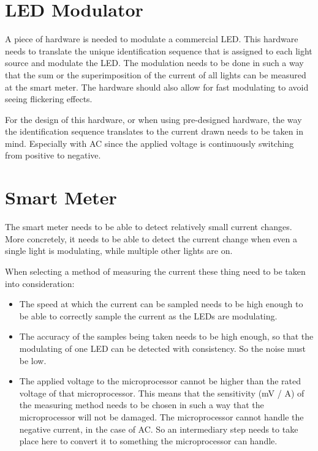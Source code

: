 	\section{LED Modulator}

	A piece of hardware is needed to modulate a commercial LED.
	This hardware needs to translate the unique identification sequence that is assigned to each light source and modulate the LED.
	The modulation needs to be done in such a way that the sum or the superimposition of the current of all lights can be measured at the smart meter.  
	The hardware should also allow for fast modulating to avoid seeing flickering effects.


	For the design of this hardware, or when using pre-designed hardware, the way the identification sequence translates to the current drawn needs to be taken in mind. 
	Especially with AC since the applied voltage is continuously switching from positive to negative.



	\section{Smart Meter}

	The smart meter needs to be able to detect relatively small current changes.
	More concretely, it needs to be able to detect the current change when even a single light is modulating, while multiple other lights are on.

	When selecting a method of measuring the current these thing need to be taken into consideration:

	\begin{itemize}
		\item The speed at which the current can be sampled needs to be high enough to be able to correctly sample the current as the LEDs are modulating.

		\item The accuracy of the samples being taken needs to be high enough, so that the modulating of one LED can be detected with consistency.
		So the noise must be low.

		\item The applied voltage to the microprocessor cannot be higher than the rated voltage of that microprocessor. This means that the sensitivity (mV / A) of the measuring method needs to be chosen in such a way that the microprocessor will not be damaged.
		The microprocessor cannot handle the negative current, in the case of AC. So an intermediary step needs to take place here to convert it to something the microprocessor can handle.

	\end{itemize}


















